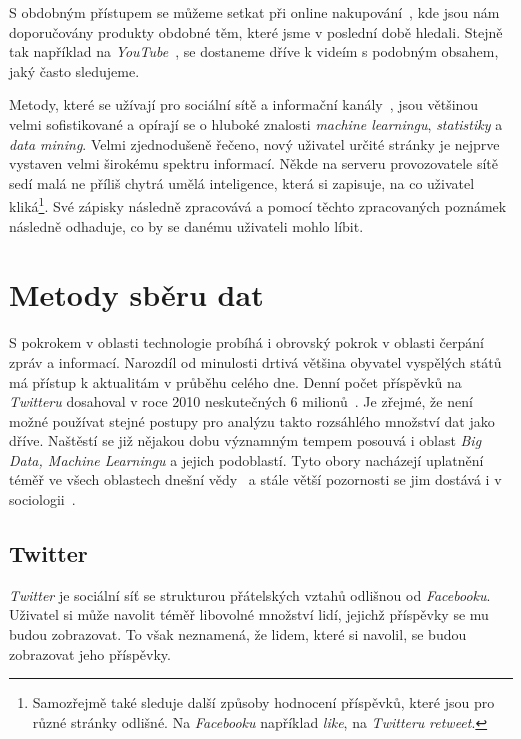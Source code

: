 \documentclass[12pt, a4paper]{article}
\numberwithin{equation}{section} 	%
\begin{document}
S obdobným přístupem se můžeme setkat při online nakupování~\cite{Amazon}, kde jsou nám doporučovány produkty obdobné těm, které jsme v poslední době hledali. Stejně tak například na \textit{YouTube}~\cite{YouTube}, se dostaneme dříve k videím s podobným obsahem, jaký často sledujeme.

Metody, které se užívají pro sociální sítě a informační kanály~\cite{TwitterRecomendation}, jsou většinou velmi sofistikované a opírají se o hluboké znalosti \textit{machine learningu}, \textit{statistiky} a \textit{data mining}. Velmi zjednodušeně řečeno, nový uživatel určité stránky je nejprve vystaven velmi širokému spektru informací. Někde na serveru provozovatele sítě sedí malá ne příliš chytrá umělá inteligence, která si zapisuje, na co uživatel kliká\footnote{Samozřejmě také sleduje další způsoby hodnocení příspěvků, které jsou pro různé stránky odlišné. Na \textit{Facebooku} například \textit{like}, na \textit{Twitteru} \textit{retweet}.}. Své zápisky následně zpracovává a pomocí těchto zpracovaných poznámek následně odhaduje, co by se danému uživateli mohlo líbit.

\newpage
\section{Metody sběru dat}
\noindent S pokrokem v oblasti technologie probíhá i obrovský pokrok v oblasti čerpání zpráv a informací. Narozdíl od minulosti drtivá většina obyvatel vyspělých států má přístup k aktualitám v průběhu celého dne. Denní počet příspěvků na \textit{Twitteru} dosahoval v roce 2010 neskutečných 6 milionů~\cite{Mathioudakis2010}. Je zřejmé, že není možné používat stejné postupy pro analýzu takto rozsáhlého množství dat jako dříve. Naštěstí se již nějakou dobu významným tempem posouvá i oblast \textit{Big Data, Machine Learningu} a jejich podoblastí. Tyto obory nacházejí uplatnění téměř ve všech oblastech dnešní vědy~\cite{Huberman2012-2-15} a stále větší pozornosti se jim dostává i v sociologii~\cite{Tinati2014, McFarland2016, Shah2015-04-09}.


\subsection{Twitter}
\noindent\textit{Twitter} je sociální síť se strukturou přátelských vztahů odlišnou od \textit{Facebooku}. Uživatel si může navolit téměř libovolné množství lidí, jejichž příspěvky se mu budou zobrazovat. To však neznamená, že lidem, které si navolil, se budou zobrazovat jeho příspěvky.
\end{document}
